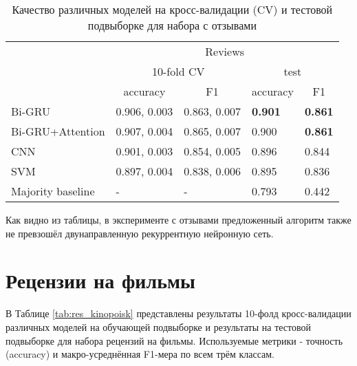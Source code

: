 \begin{table}[H]
	\centering
	\caption{Качество различных моделей на кросс-валидации (CV) и тестовой подвыборке для набора с отзывами}
	\label{tab:res_reviews}
	\begin{tabular}{l|l|l|l|l|}
		\cline{2-5}
		& \multicolumn{4}{c|}{Reviews}                                                                                      \\ \cline{2-5} 
		& \multicolumn{2}{c|}{10-fold CV}                         & \multicolumn{2}{c|}{test}                               \\ \cline{2-5} 
		& \multicolumn{1}{c|}{accuracy} & \multicolumn{1}{c|}{F1} & \multicolumn{1}{c|}{accuracy} & \multicolumn{1}{c|}{F1} \\ \hline
		\multicolumn{1}{|l|}{Bi-GRU}           & 0.906, 0.003                  & 0.863, 0.007            & \textbf{0.901}                         & \textbf{0.861}                   \\ \hline
		\multicolumn{1}{|l|}{Bi-GRU+Attention} & 0.907, 0.004                  & 0.865, 0.007            & 0.900                         & \textbf{0.861}                   \\ \hline
		\multicolumn{1}{|l|}{CNN}              & 0.901, 0.003                  & 0.854, 0.005            & 0.896                         & 0.844                   \\ \hline
		\multicolumn{1}{|l|}{SVM}              & 0.897, 0.004                  & 0.838, 0.006            & 0.895                         & 0.836                   \\ \hline
		\multicolumn{1}{|l|}{Majority baseline}              & -                  & -            & 0.793                         & 0.442                   \\ \hline
	\end{tabular}
\end{table}

Как видно из таблицы, в эксперименте с отзывами предложенный алгоритм также не превзошёл двунаправленную рекуррентную нейронную сеть.

\section{Рецензии на фильмы}
В Таблице \ref{tab:res_kinopoisk} представлены результаты 10-фолд кросс-валидации различных моделей на обучающей подвыборке и результаты на тестовой подвыборке для набора рецензий на фильмы. Используемые метрики - точность (accuracy) и макро-усреднённая F1-мера по всем трём классам.

